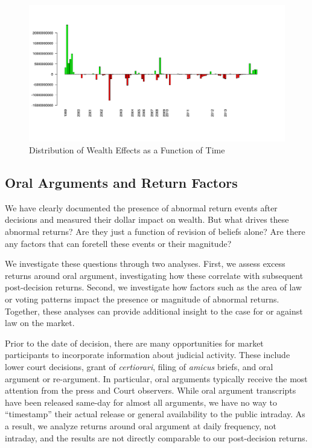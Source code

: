 \documentclass[preprint,12pt]{elsarticle}
\begin{document}
\begin{figure}[h!]
\centering
\includegraphics[width=0.9\linewidth]{figure4_dollar_wealth_event}
\caption{Distribution of Wealth Effects as a Function of Time}
\label{lotm_event_frequency}
\end{figure}

\subsection{Oral Arguments and Return Factors}
We have clearly documented the presence of abnormal return events after decisions and measured their dollar impact on wealth.  But what drives these abnormal returns?  Are they just a function of revision of beliefs alone? Are there any factors that can foretell these events or their magnitude?

We investigate these questions through two analyses.  First, we assess excess returns around oral argument, investigating how these correlate with subsequent post-decision returns.  Second, we investigate how factors such as the area of law or voting patterns impact the presence or magnitude of abnormal returns. Together, these analyses can provide additional insight to the case for or against law on the market.

Prior to the date of decision, there are many opportunities for market participants to incorporate information about judicial activity. These include lower court decisions, grant of \textit{certiorari}, filing of \textit{amicus} briefs, and oral argument or re-argument.  In particular, oral arguments typically receive the most attention from the press and Court observers.  While oral argument transcripts have been released same-day for almost all arguments, we have no way to ``timestamp'' their actual release or general availability to the public intraday.  As a result, we analyze returns around oral argument at daily frequency, not intraday, and the results are not directly comparable to our post-decision returns.
\end{document}
